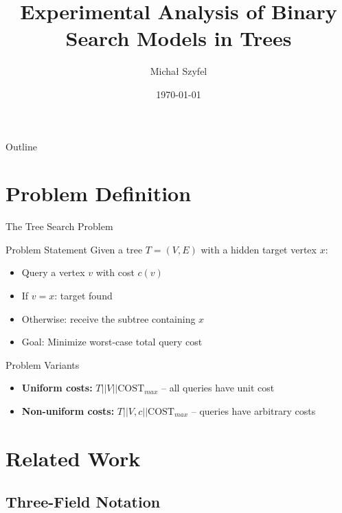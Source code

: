 \documentclass[aspectratio=169]{beamer}
\title{Experimental Analysis of Binary Search Models in Trees}
\author{Michał Szyfel}
\institute{Gdańsk University of Technology}
\date{\today}
\newcommand{\COST}{\text{COST}}
\begin{document}
\frame{\titlepage}

\begin{frame}{Outline}
\tableofcontents
\end{frame}

\section{Problem Definition}

\begin{frame}{The Tree Search Problem}
\begin{block}{Problem Statement}
Given a tree $T = (V, E)$ with a hidden target vertex $x$:
\begin{itemize}
    \item Query a vertex $v$ with cost $c(v)$
    \item If $v = x$: target found
    \item Otherwise: receive the subtree containing $x$
    \item Goal: Minimize worst-case total query cost
\end{itemize}
\end{block}

\pause

\begin{block}{Problem Variants}
\begin{itemize}
    \item \textbf{Uniform costs:} $T||V||\COST_{max}$ -- all queries have unit cost
    \item \textbf{Non-uniform costs:} $T||V, c||\COST_{max}$ -- queries have arbitrary costs
\end{itemize}
\end{block}
\end{frame}

\section{Related Work}

\subsection{Three-Field Notation}
\end{document}
